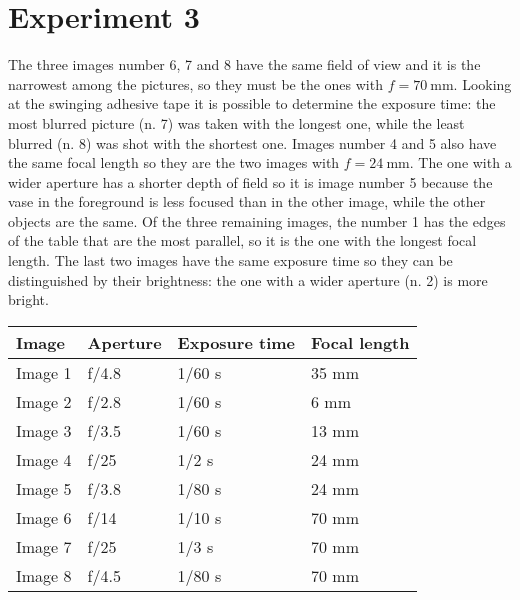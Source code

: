 \documentclass{article}
\begin{document}
\section*{Experiment 3}
The three images number 6, 7 and 8 have the same field of view and it
is the narrowest among the pictures, so they must be the ones with $f
= \SI{70}{\mm}$. Looking at the swinging adhesive tape it is possible
to determine the exposure time: the most blurred picture (n. 7) was
taken with the longest one, while the least blurred (n. 8) was shot
with the shortest one. Images number 4 and 5 also have the same focal
length so they are the two images with $f = \SI{24}{\mm}$. The one
with a wider aperture has a shorter depth of field so it is image
number 5 because the vase in the foreground is less focused than in
the other image, while the other objects are the same. Of the three
remaining images, the number 1 has the edges of the table that are the
most parallel, so it is the one with the longest focal length. The
last two images have the same exposure time so they can be
distinguished by their brightness: the one with a wider aperture
(n. 2) is more bright.
\begin{table}
  \centering
  \begin{tabular}{llll}
    Image & Aperture & Exposure time & Focal length \\
    \hline
    Image 1 & f/4.8 & 1/60 s & 35 mm \\
    Image 2 & f/2.8 & 1/60 s & 6 mm \\
    Image 3 & f/3.5 & 1/60 s & 13 mm \\
    Image 4 & f/25 & 1/2 s & 24 mm \\
    Image 5 & f/3.8 & 1/80 s & 24 mm \\
    Image 6 & f/14 & 1/10 s & 70 mm \\
    Image 7 & f/25 & 1/3 s & 70 mm \\
    Image 8 & f/4.5 & 1/80 s & 70 mm
  \end{tabular}
\end{table}
\end{document}
